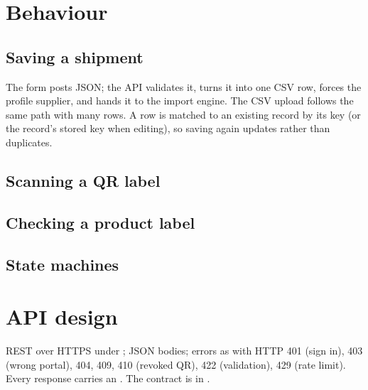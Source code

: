 \documentclass[11pt,a4paper]{article}
\begin{document}
\section{Behaviour}
\subsection{Saving a shipment}
The form posts JSON; the API validates it, turns it into one CSV row, forces the profile supplier, and hands it to the
import engine. The CSV upload follows the same path with many rows. A row is matched to an existing record by its
 key (or the record's stored key when editing), so saving again updates rather than duplicates.

\subsection{Scanning a QR label}

\subsection{Checking a product label}

\subsection{State machines}

\section{API design}
REST over HTTPS under ; JSON bodies; errors as  with HTTP
401 (sign in), 403 (wrong portal), 404, 409, 410 (revoked QR), 422 (validation), 429 (rate limit). Every response
carries an . The contract is in .
\end{document}
